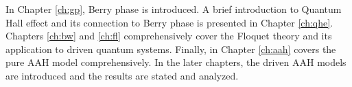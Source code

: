 In Chapter \ref{ch:gp}, Berry phase is introduced. A brief introduction to Quantum Hall effect and its connection to Berry phase is presented in Chapter \ref{ch:qhe}. Chapters
\ref{ch:bw} and \ref{ch:fl} comprehensively cover the Floquet theory and its application to driven quantum systems. Finally, in Chapter \ref{ch:aah} covers the pure AAH model comprehensively.
In the later chapters, the driven AAH models are introduced and the results are stated and analyzed.